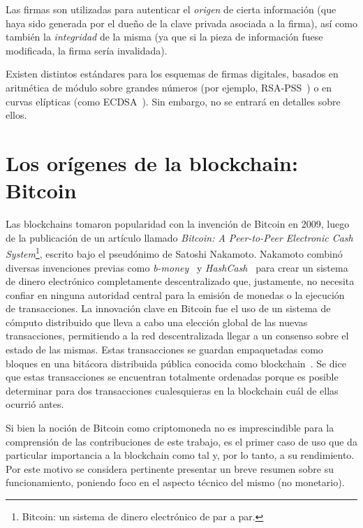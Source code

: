 Las firmas son utilizadas para autenticar el \textit{origen} de cierta información (que haya sido generada por el dueño de la clave privada
asociada a la firma), así como también la \textit{integridad} de la misma (ya que si la pieza de información fuese modificada, la firma sería invalidada).

%

Existen distintos estándares para los esquemas de firmas digitales, basados en aritmética de módulo sobre grandes números (por ejemplo,
RSA-PSS~\cite{pss.rsa}) o en curvas elípticas (como ECDSA~\cite{ecdsa}).
Sin embargo, no se entrará en detalles sobre ellos.

\section{Los orígenes de la blockchain: Bitcoin}
Las blockchains tomaron popularidad con la invención de Bitcoin en 2009, luego de la publicación
de un artículo llamado \textit{Bitcoin: A Peer-to-Peer
Electronic Cash System}\footnote{Bitcoin: un sistema de dinero electrónico de par a par.}, escrito
bajo el pseudónimo de Satoshi Nakamoto.
Nakamoto combinó diversas invenciones previas como
\textit{b-money}~\cite{b.money} y \textit{HashCash}~\cite{hashcash} para crear un sistema de dinero electrónico completamente
descentralizado que, justamente, no necesita confiar en ninguna autoridad central para la emisión de monedas
o la ejecución de transacciones. 
La innovación clave en Bitcoin fue el uso de un sistema de cómputo distribuido que lleva
a cabo una elección global de las nuevas transacciones, permitiendo
a la red descentralizada llegar a un consenso sobre el estado de las mismas. Estas transacciones
se guardan empaquetadas como bloques en una bitácora distribuida pública conocida como blockchain~\cite{mastering.bitcoin}.
%
Se dice que estas transacciones se encuentran totalmente ordenadas porque es posible determinar para
dos transacciones cualesquieras en la blockchain cuál de ellas ocurrió antes.


%
Si bien la noción de Bitcoin como criptomoneda no es imprescindible para la comprensión de las
contribuciones de este trabajo, es el primer caso de uso que da particular importancia a la blockchain
como tal y, por lo tanto, a su rendimiento. Por este motivo se considera pertinente presentar un breve resumen sobre
su funcionamiento, poniendo foco en el aspecto técnico del mismo (no monetario).

